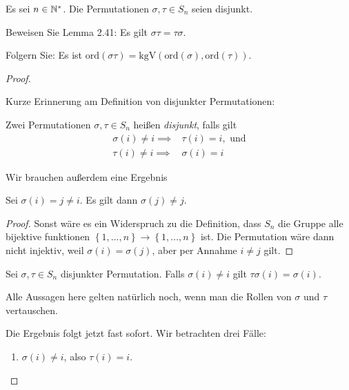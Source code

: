 \begin{Problem}
	Es sei $n\in \mathbb{N}^*$. Die Permutationen $\sigma, \tau\in S_n$ seien disjunkt.
	\begin{parts}
	\item Beweisen Sie Lemma 2.41: Es gilt $\sigma\tau=\tau\sigma$.
	\item Folgern Sie: Es ist $\text{ord}(\sigma\tau)=\text{kgV}(\text{ord}(\sigma),\text{ord}(\tau))$.
	\end{parts}
\end{Problem}
\begin{proof}
	\begin{parts}
	\item Kurze Erinnerung am Definition von disjunkter Permutationen:
		\begin{tcolorbox}
			\begin{Definition}\label{def:introalgblatt5-1}
			Zwei Permutationen $\sigma,\tau\in S_n$ heißen \emph{disjunkt}, falls gilt
			\begin{align*}
				\sigma(i)\neq i\implies& \tau(i)=i,\text{ und}\\
				\tau(i)\neq i\implies& \sigma(i)=i
			\end{align*}
		\end{Definition}
		\end{tcolorbox}
		Wir brauchen außerdem eine Ergebnis
		\begin{tcolorbox}
			\begin{Lemma}
				Sei $\sigma(i)=j\neq i$. Es gilt dann $\sigma(j)\neq j$.
			\end{Lemma}
			\begin{proof}
				Sonst wäre es ein Widerspruch zu die Definition, dass $S_n$ die Gruppe alle bijektive funktionen $\left\{ 1,\dots, n \right\} \to \left\{ 1, \dots, n \right\} $ ist. Die Permutation wäre dann nicht injektiv, weil $\sigma(i)=\sigma(j)$, aber per Annahme $i\neq j$ gilt.
			\end{proof}
			\begin{Corollary}\label{corollary:introalgblatt5-1}
			Sei $\sigma,\tau\in S_n$ disjunkter Permutation. Falls $\sigma(i)\neq i$ gilt $\tau\sigma\left( i \right) =\sigma(i)$.
			\end{Corollary}
			\begin{Remark}
				Alle Aussagen here gelten natürlich noch, wenn man die Rollen von $\sigma$ und $\tau$ vertauschen.
			\end{Remark}
		\end{tcolorbox}Die Ergebnis folgt jetzt fast sofort. Wir betrachten drei F\"{a}lle:
		\begin{enumerate}[label=(\roman*)]
			\item $\sigma(i)\neq i$, also $\tau(i)=i$.


\end{enumerate}
\end{parts}
\end{proof}
